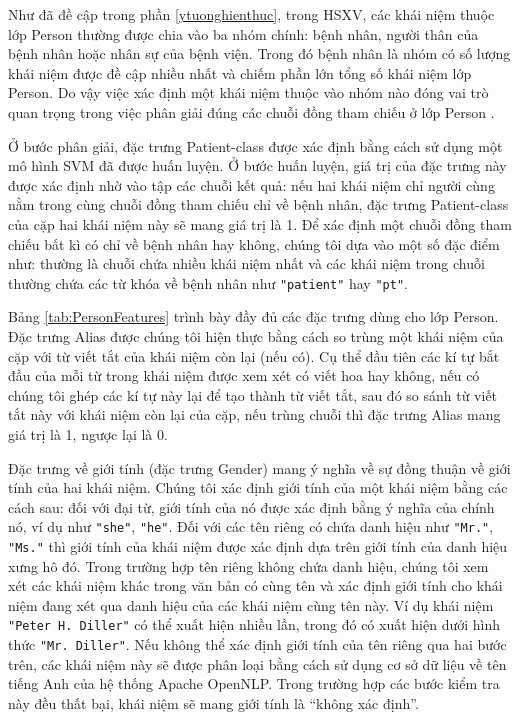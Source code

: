Như đã đề cập trong phần \ref{ytuonghienthuc}, trong HSXV, các khái niệm thuộc lớp Person thường được chia vào ba nhóm chính: bệnh nhân, người thân của bệnh nhân hoặc nhân sự của bệnh viện. Trong đó bệnh nhân là nhóm có số lượng khái niệm được đề cập nhiều nhất và chiếm phần lớn tổng số khái niệm lớp Person. Do vậy việc xác định một khái niệm thuộc vào nhóm nào đóng vai trò quan trọng trong việc phân giải đúng các chuỗi đồng tham chiếu ở lớp Person \cite{YanXu2012}. 

Ở bước phân giải, đặc trưng Patient-class được xác định bằng cách sử dụng một mô hình SVM đã được huấn luyện. Ở bước huấn luyện, giá trị của đặc trưng này được xác định nhờ vào tập các chuỗi kết quả: nếu hai khái niệm chỉ người cùng nằm trong cùng chuỗi đồng tham chiếu chỉ về bệnh nhân, đặc trưng Patient-class của cặp hai khái niệm này sẽ mang giá trị là 1. Để xác định một chuỗi đồng tham chiếu bất kì có chỉ về bệnh nhân hay không, chúng tôi dựa vào một số đặc điểm như: thường là chuỗi chứa nhiều khái niệm nhất và các khái niệm trong chuỗi thường chứa các từ khóa về bệnh nhân như \texttt{"patient"} hay \texttt{"pt"}.

Bảng \ref{tab:PersonFeatures} trình bày đầy đủ các đặc trưng dùng cho lớp Person. Đặc trưng Alias được chúng tôi hiện thực bằng cách so trùng một khái niệm của cặp với từ viết tắt của khái niệm còn lại (nếu có). Cụ thể đầu tiên các kí tự bắt đầu của mỗi từ trong khái niệm được xem xét có viết hoa hay không, nếu có chúng tôi ghép các kí tự này lại để tạo thành từ viết tắt, sau đó so sánh từ viết tắt này với khái niệm còn lại của cặp, nếu trùng chuỗi thì đặc trưng Alias mang giá trị là 1, ngược lại là 0.

Đặc trưng về giới tính (đặc trưng Gender) mang ý nghĩa về sự đồng thuận về giới tính của hai khái niệm. Chúng tôi xác định giới tính của một khái niệm bằng các cách sau: đối với đại từ, giới tính của nó được xác định bằng ý nghĩa của chính nó, ví dụ như \texttt{"she"}, \texttt{"he"}. Đối với các tên riêng có chứa danh hiệu như \texttt{"Mr."}, \texttt{"Ms."} thì giới tính của khái niệm được xác định dựa trên giới tính của danh hiệu xưng hô đó. Trong trường hợp tên riêng không chứa danh hiệu, chúng tôi xem xét các khái niệm khác trong văn bản có cùng tên và xác định giới tính cho khái niệm đang xét qua danh hiệu của các khái niệm cùng tên này. Ví dụ khái niệm \texttt{"Peter H. Diller"} có thể xuất hiện nhiều lần, trong đó có xuất hiện dưới hình thức \texttt{"Mr. Diller"}. Nếu không thể xác định giới tính của tên riêng qua hai bước trên, các khái niệm này sẽ được phân loại bằng cách sử dụng cơ sở dữ liệu về tên tiếng Anh của hệ thống Apache OpenNLP. Trong trường hợp các bước kiểm tra này đều thất bại, khái niệm sẽ mang giới tính là ``không xác định''.

